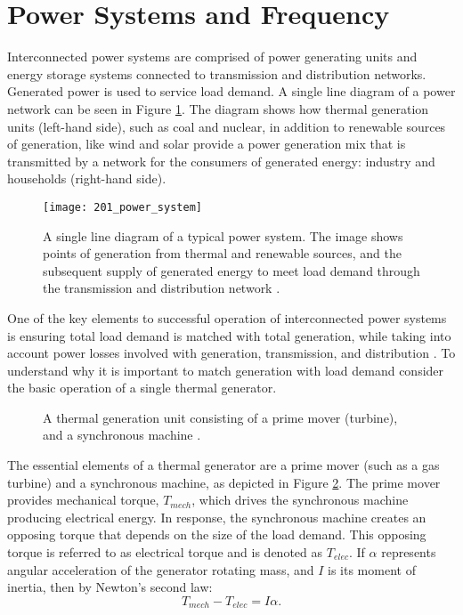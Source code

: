 \section{Power Systems and Frequency}
Interconnected power systems are comprised of power generating units and energy storage systems connected to transmission and distribution networks. Generated power is used to service load demand. A single line diagram of a power network can be seen in Figure \ref{fig:201_power_system}. The diagram shows how thermal generation units (left-hand side), such as coal and nuclear, in addition to renewable sources of generation, like wind and solar provide a power generation mix that is transmitted by a network for the consumers of generated energy: industry and households (right-hand side).
\begin{figure}[ht]
	\centering
	\texttt{[image: 201\_power\_system]}
	\caption[High level overview of a power network]{A single line diagram of a typical power system. The image shows points of generation from thermal and renewable sources, and the subsequent supply of generated energy to meet load demand through the transmission and distribution network \cite{Glavic2019}.}
	\label{fig:201_power_system}
\end{figure}

One of the key elements to successful operation of interconnected power systems is ensuring total load demand is matched with total generation, while taking into account power losses involved with generation, transmission, and distribution \cite{Wood2013}. To understand why it is important to match generation with load demand consider the basic operation of a single thermal generator. 
\begin{figure}[h]
	\centering
	\resizebox{15cm}{!}{}
	\caption[Turbine generator model]{A thermal generation unit consisting of a prime mover (turbine), and a synchronous machine \cite{Wood2013}.}
	\label{fig:202_generation}
\end{figure}

The essential elements of a thermal generator are a prime mover (such as a gas turbine) and a synchronous machine, as depicted in Figure \ref{fig:202_generation}. The prime mover provides mechanical torque, $T_{mech}$, which drives the synchronous machine producing electrical energy. In response, the synchronous machine creates an opposing torque that depends on the size of the load demand. This opposing torque is referred to as electrical torque and is denoted as $T_{elec}$. If $\alpha$ represents angular acceleration of the generator rotating mass, and $I$ is its moment of inertia, then by Newton's second law:
\begin{equation}
	T_{mech} - T_{elec} = I \alpha. \label{eq:201}
\end{equation}

